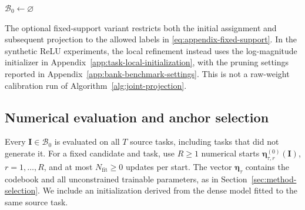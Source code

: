 \begin{algorithm}[htbp]
    \small
    \DontPrintSemicolon
    \SetAlgoNoEnd
    $\mathcal B_0\leftarrow\varnothing$\;
    \;
    \caption{Initial bank from single-source projections}
    \label{alg:initial-bank}
\end{algorithm}

The optional fixed-support variant restricts both the initial
assignment and subsequent projection to the allowed labels in
\eqref{eq:appendix-fixed-support}. In the synthetic ReLU experiments,
the local refinement instead uses the log-magnitude initializer in
Appendix~\ref{app:task-local-initialization}, with the pruning settings
reported in Appendix~\ref{app:bank-benchmark-settings}. This is not a
raw-weight calibration run of Algorithm~\ref{alg:joint-projection}.

\subsection{Numerical evaluation and anchor selection}
\label{app:anchor-preparation}

Every $\mathbf I\in\mathcal B_0$ is evaluated on all
$T$ source tasks, including tasks that did not generate it.
For a fixed candidate and task, use $R\ge1$ numerical starts
$\boldsymbol\eta_{\tau,r}^{(0)}(\mathbf I)$, $r=1,\ldots,R$,
and at most $N_{\mathrm{fit}}\ge0$ updates per start. The vector
$\boldsymbol\eta_\tau$ contains the codebook and all unconstrained
trainable parameters, as in Section~\ref{sec:method-selection}.
We include an initialization derived from the dense model fitted
to the same source task.

